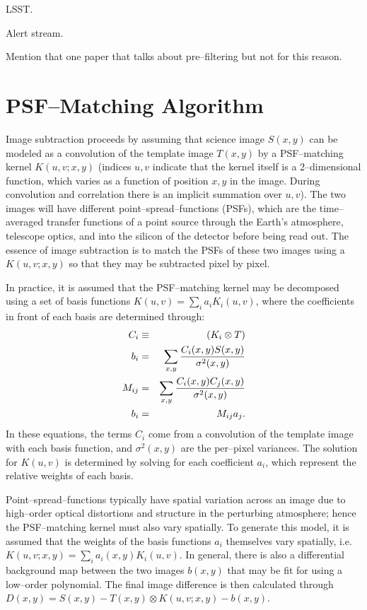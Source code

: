 \documentclass[floatfix, apj]{emulateapj}
\begin{document}
LSST.

Alert stream.

Mention that one paper that talks about pre--filtering but not for this reason.

\section{PSF--Matching Algorithm}

Image subtraction proceeds by assuming that science image $S(x,y)$ can be modeled as a convolution of the template image $T(x,y)$ by a PSF--matching kernel $K(u,v;x,y)$ (indices $u,v$ indicate that the kernel itself is a 2--dimensional function, which varies as a function of position $x,y$ in the image.
During convolution and correlation there is an implicit summation over $u,v$).
The two images will have different point--spread--functions (PSFs), which are the time--averaged transfer functions of a point source through the Earth's atmosphere, telescope optics, and into the silicon of the detector before being read out.
The essence of image subtraction is to match the PSFs of these two images using a $K(u,v;x,y)$ so that they may be subtracted pixel by pixel.

In practice, it is assumed that the PSF--matching kernel may be decomposed using a set of basis functions $K(u,v) = \sum_i a_i K_i(u,v)$, where the coefficients in front of each basis are determined through:
\begin{eqnarray}
\label{eq-soln}
C_i & \equiv & (K_i \otimes T) \\ 
b_{i}  & = & \sum_{x,y} {{C_i(x,y) S(x,y)}\over{\sigma^2(x,y)}}   \nonumber \\
M_{ij} & = & \sum_{x,y} {{C_i(x,y) C_j(x,y)}\over{\sigma^2(x,y)}}  \nonumber \\
b_{i}  & = & M_{ij} a_{j}. \nonumber
\end{eqnarray}
In these equations, the terms $C_i$ come from a convolution of the template image with each basis function, and $\sigma^2(x,y)$ are the per--pixel variances.
The solution for $K(u,v)$ is determined by solving for each coefficient $a_i$, which represent the relative weights of each basis.

Point--spread--functions typically have spatial variation across an image due to high--order optical distortions and structure in the perturbing atmosphere; hence the PSF--matching kernel must also vary spatially.
To generate this model, it is assumed that the weights of the basis functions $a_i$ themselves vary spatially, i.e. $K(u,v;x,y) = \sum_i a_i(x,y) K_i(u,v)$.
In general, there is also a differential background map between the two images $b(x,y)$ that may be fit for using a low--order polynomial.
The final image difference is then calculated through $D(x,y) = S(x,y) - T(x,y) \otimes K(u,v;x,y) - b(x,y)$.
\end{document}
